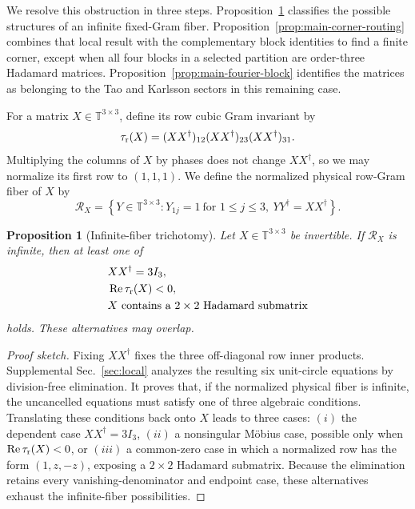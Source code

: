 \documentclass[aps,prx,reprint,nofootinbib,twoside,superscriptaddress,longbibliography,floatfix]{revtex4-2}
\newtheorem{proposition}[theorem]{Proposition}
\theoremstyle{definition}
\newcommand{\T}{\mathbb T}
\newcommand{\RePart}{\operatorname{Re}}
\begin{document}
We resolve this obstruction in three steps. Proposition~\ref{prop:main-infinite-fiber-trichotomy} classifies the possible structures of an infinite fixed-Gram fiber. Proposition~\ref{prop:main-corner-routing} combines that local result with the complementary block identities to find a finite corner, except when all four blocks in a selected partition are order-three Hadamard matrices. Proposition~\ref{prop:main-fourier-block} identifies the matrices
as belonging to the Tao and Karlsson sectors in this remaining case.

For a matrix $X \in \mathbb{T}^{3 \times 3}$, define its row cubic Gram invariant by
\begin{equation}
\tau_{\rm r}(X)
=(XX^\dagger)_{12}(XX^\dagger)_{23}(XX^\dagger)_{31}.
\label{eq:main-row-cubic-invariant}
\end{equation}
Multiplying the columns of $X$ by phases does not change $XX^\dagger$,
so we may normalize its first row to $(1,1,1)$. We define the normalized physical row-Gram fiber of $X$ by
\begin{equation}
\mathcal R_X=
\left\{
Y\in\T^{3\times3}:
Y_{1j}=1\ \text{for }1\leq j\leq3,\ 
YY^\dagger=XX^\dagger
\right\}.
\label{eq:main-normalized-fiber}
\end{equation}

\begin{proposition}[Infinite-fiber trichotomy]
\label{prop:main-infinite-fiber-trichotomy}
Let $X\in\T^{3\times3}$ be invertible. If $\mathcal R_X$ is infinite,
then at least one of
\begin{equation}
\begin{aligned}
&XX^\dagger=3I_3,\\
&\RePart\tau_{\rm r}(X)<0,\\
&X\text{ contains a }2\times2\text{ Hadamard submatrix}
\end{aligned}
\label{eq:main-fixed-gram-trichotomy}
\end{equation}
holds. These alternatives may overlap.
\end{proposition}

\begin{proof}[Proof sketch]
Fixing $XX^\dagger$ fixes the three off-diagonal row inner products. Supplemental Sec.~\ref{sec:local} analyzes the resulting six unit-circle equations by division-free elimination. It proves that, if the normalized physical fiber is infinite, the uncancelled equations must satisfy one of three algebraic conditions.
Translating these conditions back onto $X$ leads to three cases: $(i)$ the dependent case $XX^\dagger=3I_3$, $(ii)$ a nonsingular M\"obius case, possible only when $\operatorname{Re}\tau_{\rm r}(X)<0$, or $(iii)$ a common-zero case in which a normalized row has the form $(1,z,-z)$, exposing a $2\times2$ Hadamard submatrix. Because the elimination retains every vanishing-denominator and endpoint case, these alternatives exhaust the infinite-fiber possibilities.
\end{proof}
\end{document}
